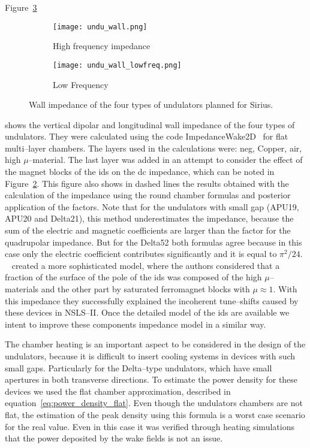     Figure~\ref{fig:undu_wall}
    \begin{figure}
        \centering
        \begin{subfigure}[c]{0.65\textwidth}
            \centering
            \texttt{[image: undu\_wall.png]}
            \caption{High frequency impedance}
            \label{fig:undu_wall_highfreq}
        \end{subfigure}
        \begin{subfigure}[c]{0.34\textwidth}
            \centering
            \texttt{[image: undu\_wall\_lowfreq.png]}
            \caption{Low Frequency}
            \label{fig:undu_wall_lowfreq}
        \end{subfigure}
        \caption{Wall impedance of the four types of undulators planned for Sirius.}
        \label{fig:undu_wall}
    \end{figure}
    shows the vertical dipolar and longitudinal wall impedance of the four types of undulators. They were calculated using the code ImpedanceWake2D~\cite{Mounet2011} for flat multi--layer chambers. The layers used in the calculations were: \gls{neg}, Copper, air, high $\mu$--material. The last layer was added in an attempt to consider the effect of the magnet blocks of the \glspl{id} on the \gls{dc} impedance, which can be noted in Figure~\ref{fig:undu_wall_lowfreq}. This figure also shows in dashed lines the results obtained with the calculation of the impedance using the round chamber formulas and posterior application of the  factors. Note that for the undulators with small gap (APU19, APU20 and Delta21), this method underestimates the impedance, because the sum of the electric and magnetic  coefficients are larger than the factor for the quadrupolar impedance. But for the Delta52 both formulas agree because in this case only the electric coefficient contributes significantly and it is equal to $\pi^2/24$.
    ~ created a more sophisticated model, where the authors considered that a fraction of the surface of the pole of the \glspl{id} was composed of the high $\mu$--materials and the other part by saturated ferromagnet blocks with $\mu\approx1$. With this impedance they successfully explained the incoherent tune--shifts caused by these devices in NSLS--II. Once the detailed model of the \glspl{id} are available we intent to improve these components impedance model in a similar way.

    The chamber heating is an important aspect to be considered in the design of the undulators, because it is difficult to insert cooling systems in devices with such small gaps. Particularly for the Delta--type undulators, which have small apertures in both transverse directions. To estimate the power density for these devices we used the flat chamber approximation, described in equation~\eqref{eq:power_density_flat}. Even though the undulators chambers are not flat, the estimation of the peak density using this formula is a worst case scenario for the real value. Even in this case it was verified through heating simulations that the power deposited by the wake fields is not an issue.


